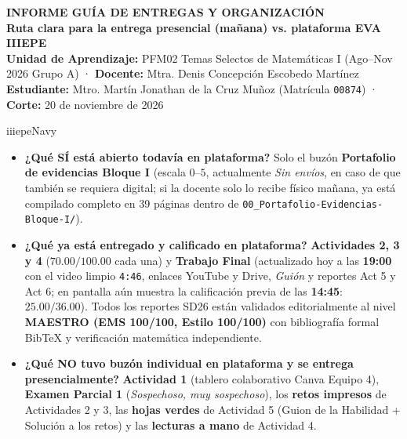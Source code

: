 \documentclass[spanish,letterpaper,oneside]{article}
\begin{document}
\color{iiiepeInk}

\begin{center}
  {\Large\bfseries\color{iiiepeNavy} INFORME GUÍA DE ENTREGAS Y ORGANIZACIÓN}\\[4pt]
  {\normalsize\bfseries Ruta clara para la entrega presencial (mañana) vs. plataforma EVA IIIEPE}\\[4pt]
  {\small\textbf{Unidad de Aprendizaje:} PFM02 Temas Selectos de Matemáticas I (Ago--Nov 2026 Grupo A) · \textbf{Docente:} Mtra. Denis Concepción Escobedo Martínez}\\
  {\small\textbf{Estudiante:} Mtro. Martín Jonathan de la Cruz Muñoz (Matrícula \texttt{00874}) · \textbf{Corte:} 20 de noviembre de 2026}
\end{center}

\vspace{2pt}
\begin{guiabox}[title={Lectura rápida en 30 segundos (para no confundir plataforma vs. entrega presencial)}]{iiiepeNavy}
\begin{itemize}[leftmargin=1.4em,itemsep=2pt]
  \item \textbf{¿Qué SÍ está abierto todavía en plataforma?} Solo el buzón \textbf{Portafolio de evidencias Bloque I} (escala $0\text{--}5$, actualmente \textit{Sin envíos}, en caso de que también se requiera digital; si la docente solo lo recibe físico mañana, ya está compilado completo en 39 páginas dentro de \texttt{00\_Portafolio-Evidencias-Bloque-I/}).
  \item \textbf{¿Qué ya está entregado y calificado en plataforma?} \textbf{Actividades 2, 3 y 4} ($70.00/100.00$ cada una) y \textbf{Trabajo Final} (actualizado hoy a las \textbf{19:00} con el video limpio \texttt{4:46}, enlaces YouTube y Drive, \textit{Guión} y reportes Act 5 y Act 6; en pantalla aún muestra la calificación previa de las \textbf{14:45}: $25.00/36.00$). Todos los reportes SD26 están validados editorialmente al nivel \textbf{MAESTRO (EMS 100/100, Estilo 100/100)} con bibliografía formal BibTeX y verificación matemática independiente.
  \item \textbf{¿Qué NO tuvo buzón individual en plataforma y se entrega presencialmente?} \textbf{Actividad 1} (tablero colaborativo Canva Equipo 4), \textbf{Examen Parcial 1} (\textit{Sospechoso, muy sospechoso}), los \textbf{retos impresos} de Actividades 2 y 3, las \textbf{hojas verdes} de Actividad 5 (Guion de la Habilidad + Solución a los retos) y las \textbf{lecturas a mano} de Actividad 4.
\end{itemize}
\end{guiabox}
\end{document}
